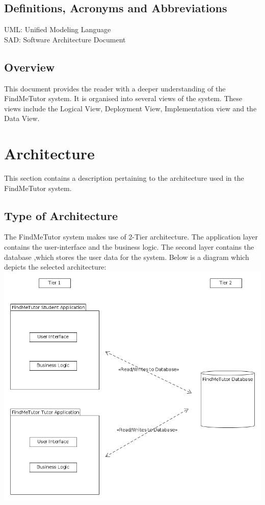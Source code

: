 \documentclass[12pt]{article}
\begin{document}
\subsection{Definitions, Acronyms and Abbreviations}
UML: Unified Modeling Language\\
SAD: Software Architecture Document

\subsection{Overview}
This document provides the reader with a deeper understanding of the FindMeTutor system. It is organised into several views of the system. These views include the Logical View, Deployment View, Implementation view and the Data View.

\pagebreak

\section{Architecture}
This section contains a description pertaining to the architecture used in the FindMeTutor system.

\subsection{Type of Architecture}
The FindMeTutor system makes use of 2-Tier architecture. The application layer contains the user-interface and the business logic. The second layer contains the database ,which stores the user data for the system. Below is a diagram which depicts the selected architecture:\\
\includegraphics[width=140mm]{./2_Tier_Diagram.png}\\
\end{document}
